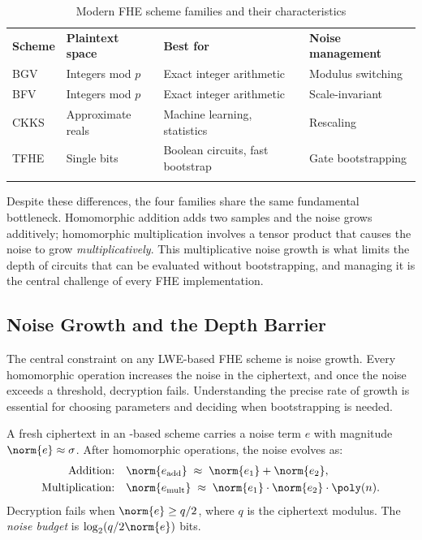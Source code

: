 \begin{table}[t]
\caption{Modern FHE scheme families and their characteristics}
\label{tab:fhe-schemes}
\begin{tabular}{p{2cm}p{3.5cm}p{3cm}p{3cm}}
\hline\noalign{\smallskip}
\textbf{Scheme} & \textbf{Plaintext space} & \textbf{Best for} & \textbf{Noise management} \\
\noalign{\smallskip}\svhline\noalign{\smallskip}
BGV & Integers mod $p$ & Exact integer arithmetic & Modulus switching \\
BFV & Integers mod $p$ & Exact integer arithmetic & Scale-invariant \\
CKKS & Approximate reals & Machine learning, statistics & Rescaling \\
TFHE & Single bits & Boolean circuits, fast bootstrap & Gate bootstrapping \\
\noalign{\smallskip}\hline
\end{tabular}
\end{table}

Despite these differences, the four families share the same fundamental bottleneck.  Homomorphic addition adds two \lwe{} samples and the noise grows additively; homomorphic multiplication involves a tensor product that causes the noise to grow \emph{multiplicatively}.  This multiplicative noise growth is what limits the depth of circuits that can be evaluated without bootstrapping, and managing it is the central challenge of every FHE implementation.


\subsection{Noise Growth and the Depth Barrier}
\label{subsec:noise-growth}

The central constraint on any LWE-based FHE scheme is noise growth.  Every homomorphic operation increases the noise in the ciphertext, and once the noise exceeds a threshold, decryption fails.  Understanding the precise rate of growth is essential for choosing parameters and deciding when bootstrapping is needed.

\begin{definition}
\label{def:noise-budget}
A fresh ciphertext in an \lwe{}-based scheme carries a noise term $e$ with magnitude $\norm{e} \approx \sigma$.  After homomorphic operations, the noise evolves as:
\begin{align}
\text{Addition:}\quad & \norm{e_{\mathrm{add}}} \;\approx\; \norm{e_1} + \norm{e_2}, \label{eq:noise-add}\\
\text{Multiplication:}\quad & \norm{e_{\mathrm{mult}}} \;\approx\; \norm{e_1}\cdot\norm{e_2}\cdot\poly(n). \label{eq:noise-mult}
\end{align}
Decryption fails when $\norm{e} \geq q/2$, where $q$ is the ciphertext modulus.  The \emph{noise budget} is $\log_2(q / 2\norm{e})$ bits.
\end{definition}

